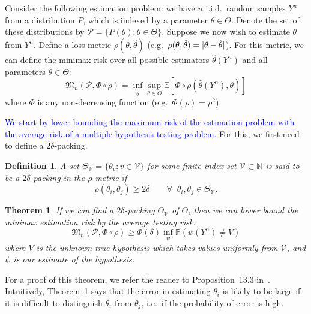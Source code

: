 \documentclass[conference]{IEEEtran}
\DeclarePairedDelimiter\abs{\lvert}{\rvert}
\newcommand{\Phiorho}{\Phi\!\circ\!\rho}
\newtheorem{theorem}{Theorem}
\newtheorem{definition}{Definition}
\begin{document}
Consider the following estimation problem: we have $n$ i.i.d.\ random samples
$Y^n$ from a distribution $P$, which is indexed by a parameter $\theta \in
\Theta$.  Denote the set of these distributions by $\mathcal{P} = \{P(\theta) :
\theta \in \Theta\}$. Suppose we now wish to estimate $\theta$ from $Y^n$.
Define a loss metric $\rho(\theta, \hat\theta)$ (e.g.\ $\rho(\theta,
\hat\theta) = \abs{\theta - \hat\theta}$). For this metric, we can define the
minimax risk over all possible estimators $\hat\theta(Y^n)$ and all parameters
$\theta \in \Theta$:
\begin{equation} \label{eq:minimax-expr}
	\mathfrak{M}_n(\mathcal{P}, \Phiorho) = \inf_{\hat\theta} \sup_{\theta \in \Theta} \mathbb E[\Phiorho (\hat\theta(Y^n), \theta)]
\end{equation}
where $\Phi$ is any non-decreasing function (e.g.\ $\Phi(\rho) = \rho^2$).

\textcolor{blue}{We start by lower bounding the maximum risk of the estimation problem with the
average risk of a multiple hypothesis testing problem.} For this, we first need
to define a $2\delta$-packing.%
\begin{definition}
	A set $\Theta_{\mathcal{V}} = \{ \theta_v : v \in \mathcal{V} \}$ for some
	finite index set $\mathcal{V} \subset \mathbb N$ is said to be a
	$2\delta$-packing in the $\rho$-metric if
	\begin{equation}
		\rho(\theta_i, \theta_j) \geq 2\delta \qquad \forall \;\; \theta_i, \theta_j \in \Theta_{\mathcal{V}}.
	\end{equation}
\end{definition}
\begin{theorem} \label{thm:est-to-testing}%
	If we can find a $2\delta$-packing $\Theta_{\mathcal{V}}$ of $\Theta$, then
	we can lower bound the minimax estimation risk by the average testing risk:
	\begin{equation}
		\mathfrak{M}_n(\mathcal{P}, \Phiorho) \geq \Phi(\delta) \inf_\psi \mathbb P (\psi(Y^n) \neq V)
	\end{equation}
	where $V$ is the unknown true hypothesis which takes values uniformly from
	$\mathcal{V}$, and $\psi$ is our estimate of the hypothesis.
\end{theorem}
For a proof of this theorem, we refer the reader to Proposition~13.3
in~\cite{Duchi2015Information}. Intuitively, Theorem~\ref{thm:est-to-testing}
says that the error in estimating $\theta_i$ is likely to be large if it is
difficult to distinguish $\theta_i$ from $\theta_j$, i.e.\ if the probability
of error is high.
\end{document}
